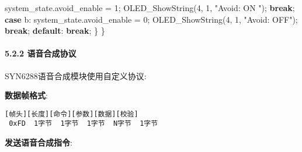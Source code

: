 \documentclass[
]{article}
\newenvironment{Shaded}{}{}
\newcommand{\CharTok}[1]{\textcolor[rgb]{0.25,0.44,0.63}{#1}}
\newcommand{\ControlFlowTok}[1]{\textcolor[rgb]{0.00,0.44,0.13}{\textbf{#1}}}
\newcommand{\DecValTok}[1]{\textcolor[rgb]{0.25,0.63,0.44}{#1}}
\newcommand{\NormalTok}[1]{#1}
\newcommand{\StringTok}[1]{\textcolor[rgb]{0.25,0.44,0.63}{#1}}
\begin{document}
\begin{Shaded}
\begin{Highlighting}[]
\NormalTok{            system\_state.avoid\_enable = }\DecValTok{1}\NormalTok{;}
\NormalTok{            OLED\_ShowString(}\DecValTok{4}\NormalTok{, }\DecValTok{1}\NormalTok{, }\StringTok{"Avoid: ON "}\NormalTok{);}
            \ControlFlowTok{break}\NormalTok{;}
        \ControlFlowTok{case} \CharTok{\textquotesingle{}b\textquotesingle{}}\NormalTok{:}
\NormalTok{            system\_state.avoid\_enable = }\DecValTok{0}\NormalTok{;}
\NormalTok{            OLED\_ShowString(}\DecValTok{4}\NormalTok{, }\DecValTok{1}\NormalTok{, }\StringTok{"Avoid: OFF"}\NormalTok{);}
            \ControlFlowTok{break}\NormalTok{;}
        \ControlFlowTok{default}\NormalTok{:}
            \ControlFlowTok{break}\NormalTok{;}
\NormalTok{    \}}
\NormalTok{\}}
\end{Highlighting}
\end{Shaded}

\hypertarget{ux8bedux97f3ux5408ux6210ux534fux8bae}{%
\paragraph{5.2.2
语音合成协议}\label{ux8bedux97f3ux5408ux6210ux534fux8bae}}

SYN6288语音合成模块使用自定义协议:

\textbf{数据帧格式}:

\begin{verbatim}
[帧头][长度][命令][参数][数据][校验]
 0xFD  1字节  1字节  1字节  N字节  1字节
\end{verbatim}

\textbf{发送语音合成指令}:
\end{document}
